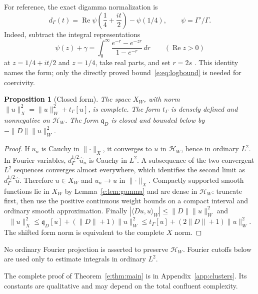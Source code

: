 \documentclass[11pt,a4paper]{article}
\numberwithin{equation}{section}
\newtheorem{proposition}[theorem]{Proposition}
\theoremstyle{definition}\newtheorem{definition}[theorem]{Definition}
\theoremstyle{remark}\newtheorem{remark}[theorem]{Remark}
\newcommand{\HH}{\mathcal H_W}\newcommand{\XX}{X_W}\newcommand{\EE}{\mathcal E_{N,\beta}}
\newcommand{\tg}{t_\Gamma}\newcommand{\cg}{c_\Gamma}
\newcommand{\qD}{\mathfrak q_D}\newcommand{\qth}{\mathfrak q_\theta}
\newcommand{\ip}[2]{\langle#1,#2\rangle}\newcommand{\norm}[1]{\lVert#1\rVert}\newcommand{\abs}[1]{\lvert#1\rvert}
\DeclareMathOperator{\Rea}{Re}\DeclareMathOperator{\Ima}{Im}
\begin{document}
For reference, the exact digamma normalization is
\begin{equation}\label{e:eq:digamma}
 d_\Gamma(t)=\Rea\psi\left(\frac14+\frac{it}{2}\right)-\psi(1/4),
 \qquad \psi=\Gamma'/\Gamma.
\end{equation}
Indeed, subtract the integral representations
\[
 \psi(z)+\gamma=\int_0^\infty
 \frac{e^{-r}-e^{-zr}}{1-e^{-r}}\,dr\qquad(\Rea z>0)
\]
at $z=1/4+it/2$ and $z=1/4$, take real parts, and set $r=2s$
\cite[Eq.~5.9.16]{DLMF}. This identity names the form; only the directly
proved bound~\eqref{e:eq:logbound} is needed for coercivity.

\begin{proposition}[Closed form]\label{e:prop:closed}
The space $\XX$, with norm
$\norm u_X^2=\norm u_W^2+\tg[u]$, is complete. The form $\tg$ is densely
defined and nonnegative on $\HH$. The form $\qD$ is closed and bounded
below by $-\norm D\norm u_W^2$.
\end{proposition}
\begin{proof}
If $u_n$ is Cauchy in $\norm{\cdot}_X$, it converges to $u$ in $\HH$,
hence in ordinary $L^2$. In Fourier variables,
$d_\Gamma^{1/2}\widehat u_n$ is Cauchy in $L^2$. A subsequence of the two
convergent $L^2$ sequences converges almost everywhere, which identifies
the second limit as $d_\Gamma^{1/2}\widehat u$. Therefore $u\in\XX$ and
$u_n\to u$ in $\norm{\cdot}_X$. Compactly supported smooth functions lie
in $\XX$ by Lemma~\ref{e:lem:gamma} and are dense in $\HH$: truncate first,
then use the positive continuous weight bounds on a compact interval and
ordinary smooth approximation. Finally
$|\ip{Du}{u}_W|\le\norm D\norm u_W^2$ and
\[
 \norm u_X^2\le \qD[u]+(\norm D+1)\norm u_W^2
 \le \tg[u]+(2\norm D+1)\norm u_W^2.
\]
The shifted form norm is equivalent to the complete $X$ norm.
\end{proof}

No ordinary Fourier projection is asserted to preserve $\HH$. Fourier
cutoffs below are used only to estimate integrals in ordinary $L^2$.


The complete proof of Theorem~\ref{e:thm:main} is in Appendix~\ref{app:clusters}. Its constants are qualitative and may depend on the total confluent complexity.
\end{document}
